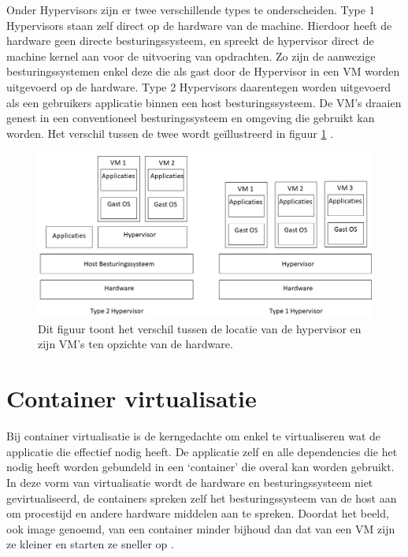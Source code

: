Onder Hypervisors zijn er twee verschillende  types te onderscheiden. Type 1 Hypervisors staan zelf direct op de hardware van de machine. Hierdoor heeft de hardware geen directe besturingssysteem, en spreekt de hypervisor direct de machine kernel aan voor de uitvoering van opdrachten. Zo zijn de  aanwezige besturingssystemen enkel deze die als gast door de Hypervisor in een VM worden uitgevoerd op de hardware. Type 2 Hypervisors daarentegen worden uitgevoerd als een gebruikers applicatie binnen een host besturingssysteem.  De VM’s draaien genest in een conventioneel besturingssysteem en omgeving die gebruikt kan worden. Het verschil tussen de twee wordt geïllustreerd in figuur \ref{fig:hyperviors} \autocite{Yadav2018,Eder2016}.

\begin{figure}[h]
    \includegraphics[width=\linewidth]{img/hypervisors.jpg}
    \caption[Verschil tussen type 1 en type 2 hypervisor]{Dit figuur toont het verschil tussen de locatie van de hypervisor en zijn VM’s ten opzichte van de hardware.}
    \label{fig:hyperviors}
    \centering
\end{figure}

\section{Container virtualisatie}

Bij container virtualisatie is de kerngedachte om enkel te virtualiseren wat de applicatie die effectief nodig heeft. De applicatie zelf en alle dependencies die het nodig heeft worden gebundeld in een ‘container’ die overal kan worden gebruikt. In deze vorm van virtualisatie wordt de hardware en besturingssysteem niet gevirtualiseerd, de containers spreken zelf het besturingssysteem van de host aan om procestijd en andere hardware middelen aan te spreken. Doordat het beeld, ook image genoemd, van een container minder bijhoud dan dat van een VM zijn ze kleiner en starten ze sneller op \autocite{Eder2016,Jangla2018}.

